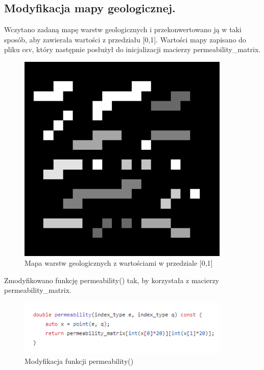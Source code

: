 \documentclass[onecolumn,12pt]{article}
\begin{document}
\subsection{Modyfikacja mapy geologicznej.}

Wczytano zadaną mapę warstw geologicznych i przekonwertowano ją w taki sposób, aby zawierała wartości z przedziału [0,1]. Wartości mapy zapisano do pliku csv, który następnie posłużył do inicjalizacji macierzy permeability\_matrix.

\begin{figure}[H]
    \centering
    \includegraphics[width=0.9\textwidth]{init_matrix.png}
    \caption{Mapa warstw geologicznych z wartościami w przedziale [0,1]}
    \label{fig:example}
\end{figure}

Zmodyfikowano funkcję permeability() tak, by korzystała z macierzy permeability\_matrix.
\begin{figure}[H]
    \centering
    \includegraphics[width=0.9\textwidth]{permeability.png}
    \caption{Modyfikacja funkcji permeability()}
    \label{fig:example}
\end{figure}
\end{document}
